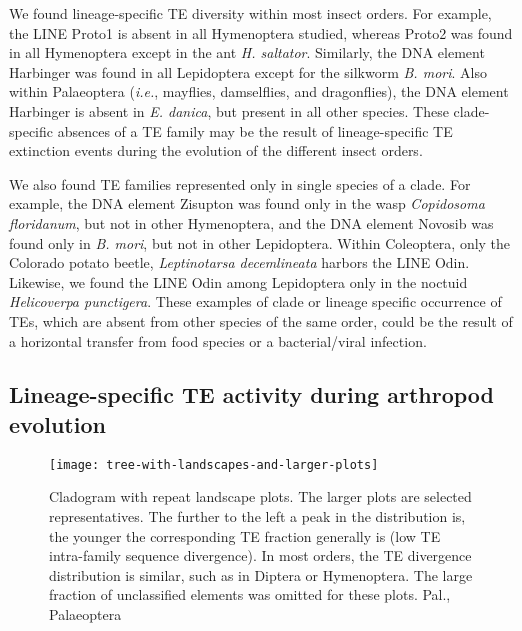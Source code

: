 We found lineage-specific TE diversity within most insect orders. For
example, the LINE Proto1 is absent in all Hymenoptera studied, whereas
Proto2 was found in all Hymenoptera except in the ant \emph{H.
saltator}. Similarly, the DNA element Harbinger was found in all
Lepidoptera except for the silkworm \emph{B. mori}. Also within
Palaeoptera (\emph{i.e.}, mayflies, damselflies, and dragonflies), the
DNA element Harbinger is absent in \emph{E. danica}, but present in all
other species. These clade-specific absences of a TE family may be the
result of lineage-specific TE extinction events during the evolution of
the different insect orders.

We also found TE families represented only in single species of a clade.
For example, the DNA element Zisupton was found only in the wasp
\emph{Copidosoma floridanum}, but not in other Hymenoptera, and the DNA
element Novosib was found only in \emph{B. mori}, but not in other
Lepidoptera. Within Coleoptera, only the Colorado potato beetle,
\emph{Leptinotarsa decemlineata} harbors the LINE Odin. Likewise, we
found the LINE Odin among Lepidoptera only in the noctuid
\emph{Helicoverpa punctigera}. These examples of clade or lineage
specific occurrence of TEs, which are absent from other species of the
same order, could be the result of a horizontal transfer from food
species or a bacterial/viral infection.



\subsection{Lineage-specific TE activity during arthropod
evolution}\label{lineage-specific-te-activity-during-arthropod-evolution}

\begin{figure}[h!]
\begin{center}
\texttt{[image: tree-with-landscapes-and-larger-plots]}
\caption[Arthropod repeat landscapes]{{Cladogram with repeat landscape
plots. The larger plots are selected representatives. The further to the
left a peak in the distribution is, the younger the corresponding TE
fraction generally is (low TE intra-family sequence divergence). In most
orders, the TE divergence distribution is similar, such as in Diptera or
Hymenoptera. The large fraction of unclassified elements was omitted for
these plots. Pal., Palaeoptera%
}}
\end{center}
\end{figure}

